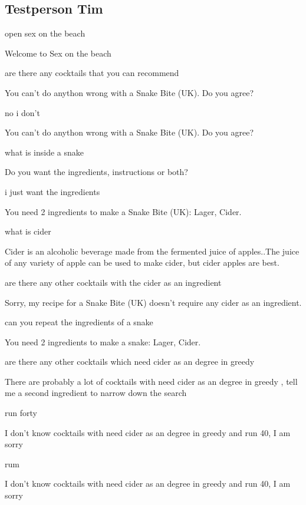 \documentclass[12pt,letterpaper]{article}
\begin{document}
\subsection{Testperson Tim}
\begin{dialogue}

open sex on the beach

 Welcome to Sex on the beach

 are there any cocktails that you can recommend

 You can't do anython wrong with a Snake Bite (UK). Do you agree?

 no i don't

 You can't do anython wrong with a Snake Bite (UK). Do you agree?

 what is inside a snake

 Do you want the ingredients, instructions or both?

 i just want the ingredients

 You need 2 ingredients to make a Snake Bite (UK): Lager, Cider.

 what is cider

 Cider is an alcoholic beverage made from the fermented juice of apples..The juice of any variety of apple can be used to make cider, but cider apples are best.

 are there any other cocktails with the cider as an ingredient

 Sorry, my recipe for a Snake Bite (UK) doesn't require any cider as an ingredient.

 can you repeat the ingredients of a snake

 You need 2 ingredients to make a snake: Lager, Cider.

 are there any other cocktails which need cider as an degree in greedy

 There are probably a lot of cocktails with need cider as an degree in greedy , tell me a second ingredient to narrow down the search

 run forty

 I don't know cocktails with need cider as an degree in greedy and run 40, I am sorry

 rum

 I don't know cocktails with need cider as an degree in greedy and run 40, I am sorry


\end{dialogue}
\end{document}
